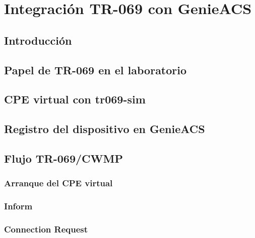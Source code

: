 %
%

\chapter{Integración TR-069 con GenieACS}
\label{cha:integracion-tr069-genieacs}

\section{Introducción}
\label{sec:introduccion-integracion-tr069-genieacs}


\section{Papel de TR-069 en el laboratorio}
\label{sec:papel-tr069-laboratorio}


\section{CPE virtual con tr069-sim}
\label{sec:cpe-virtual-tr069-sim}


\section{Registro del dispositivo en GenieACS}
\label{sec:registro-dispositivo-genieacs}


\section{Flujo TR-069/CWMP}
\label{sec:flujo-tr069-cwmp}

\subsection{Arranque del CPE virtual}
\label{subsec:arranque-cpe-virtual}

\subsection{Inform}
\label{subsec:inform}

\subsection{Connection Request}
\label{subsec:connection-request}

